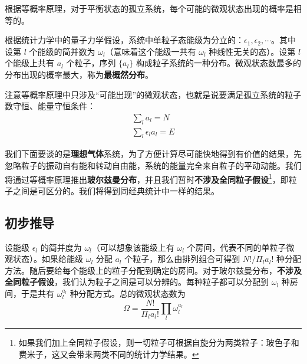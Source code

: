 

根据等概率原理，对于平衡状态的孤立系统，每个可能的微观状态出现的概率是相等的。

根据统计力学中的量子力学假设，系统中单粒子态能级为分立的：$\epsilon_1,\epsilon_2,\cdots$。其中设第 $l$ 个能级的简并数为 $\omega_l$（意味着这个能级一共有 $\omega_l$ 种线性无关的态）。设第 $l$ 个能级上共有 $a_l$ 个粒子，序列 $\{a_l\}$ 构成粒子系统的一种分布。微观状态数最多的分布出现的概率最大，称为\textbf{最概然分布}。

注意等概率原理中只涉及“可能出现”的微观状态，也就是说要满足孤立系统的粒子数守恒、能量守恒条件：
\begin{equation}\label{MBsta_eq1}
\begin{aligned}
\sum_l a_l=N\\
\sum_l \epsilon_l a_l=E
\end{aligned}
\end{equation}

我们下面要谈的是\textbf{理想气体}系统，为了方便计算尽可能快地得到有价值的结果，先忽略粒子的振动自有能和转动自由能，系统的能量完全来自粒子的平动动能。我们将通过等概率原理推出\textbf{玻尔兹曼分布}，并且我们暂时\textbf{不涉及全同粒子假设}\footnote{如果我们加上全同粒子假设，则一切粒子可根据自旋分为两类粒子：玻色子和费米子，这又会带来两类不同的统计力学结果。}，即粒子之间是可区分的。我们将得到同经典统计中一样的结果。

\subsection{初步推导}
设能级 $\epsilon_l$ 的简并度为 $\omega_l$（可以想象该能级上有 $\omega_l$ 个房间，代表不同的单粒子微观状态）。如果给能级 $\omega_l$ 分配 $a_l$ 个粒子，那么由排列组合可得到 $N!/\Pi_l a_l!$ 种分配方法。随后要给每个能级上的粒子分配到确定的房间。对于玻尔兹曼分布，\textbf{不涉及全同粒子假设}，我们认为粒子之间是可以分辨的。每种粒子都可以分配到 $\omega_l$ 种房间，于是共有 $\omega_l^{a_l}$ 种分配方式。总的微观状态数为
\begin{equation}
\Omega=\frac{N!}{\Pi_l a_l!}\prod_l\omega_l^{a_l}
\end{equation}

